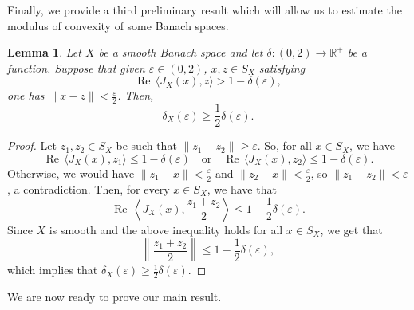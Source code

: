 \documentclass[a4paper,10pt]{amsart}
\theoremstyle{plain}
\newtheorem{lemma}[theorem]{Lemma}
\theoremstyle{definition}
\DeclareMathOperator{\re}{Re\,}
\newcommand{\R}{\mathbb{R}}
\newcommand{\eps}{\varepsilon}
\renewcommand{\geq}{\geqslant}
\renewcommand{\leq}{\leqslant}
\begin{document}
Finally, we provide a third preliminary result which will allow us to estimate the modulus of convexity of some Banach spaces.

\begin{lemma}\label{lemma-estimation-modulus-of-convexity}
Let $X$ be a smooth Banach space and let $\delta: (0,2)\longrightarrow \R^+$ be a function. Suppose that given $\eps \in (0, 2)$, $x, z \in S_X$ satisfying
\begin{equation*}
\re \langle J_{X}(x), z \rangle > 1 - \delta (\eps),	
\end{equation*}
one has $\|x - z\| < \frac{\eps}{2}$.
Then,
\begin{equation*}
\delta_{X} (\eps) \geq \frac{1}{2} \delta(\eps).
\end{equation*}
\end{lemma}

\begin{proof}
Let $z_1, z_2 \in S_{X}$ be such that $\|z_1 - z_2\| \geq \eps$. So, for all $x \in S_{X}$, we have
\begin{equation*}
\re \langle J_{X}(x), z_1 \rangle \leq 1 - \delta (\eps) \quad \text{or} \quad \re \langle J_{X}(x), z_2 \rangle \leq 1 - \delta(\eps).	
\end{equation*}
Otherwise, we would have $\|z_1 - x\| < \frac{\eps}{2}$ and  $\|z_2 - x\| < \frac{\eps}{2}$, so $\|z_1 - z_2\| < \eps$, a contradiction. Then, for every $x \in S_{X}$, we have that
\begin{equation*}
\re \left\langle J_{X}(x), \frac{z_1 + z_2}{2} \right\rangle \leq 1 - \frac{1}{2} \delta (\eps).	
\end{equation*}
Since $X$ is smooth and the above inequality holds for all $x \in S_{X}$, we get that
\begin{equation*}
\left\| \frac{z_1 + z_2}{2} \right\| \leq 1 - \frac{1}{2} \delta (\eps),	
\end{equation*}
which implies that
$\delta_{X} (\eps) \geq \frac{1}{2} \delta(\eps).$
\end{proof}

We are now ready to prove our main result.
\end{document}

